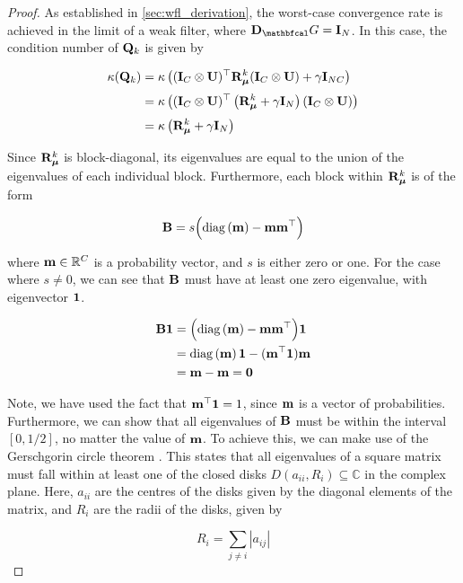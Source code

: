 \begin{proof}
    As established in \cref{sec:wfl_derivation}, the worst-case convergence rate is achieved in the limit of a weak filter, where $\D_\Gt = \I_N$. In this case, the condition number of $\mathbf{Q}_k$ is given by 

    \begin{align*}
        \kappa(\mathbf{Q}_k) &= \kappa\left( (\mathbf{I}_C \otimes \mathbf{U})^\top \mathbf{R}_{\boldsymbol{\mu}}^k (\mathbf{I}_C \otimes \mathbf{U}) + \gamma \mathbf{I}_{NC}\right) \\[0.1cm]
        &=  \kappa\left( (\mathbf{I}_C \otimes \mathbf{U})^\top \left(\mathbf{R}_{\boldsymbol{\mu}}^k + \gamma \mathbf{I}_N\right) (\mathbf{I}_C \otimes \mathbf{U})  \right) \\[0.1cm]
        &= \kappa\left( \mathbf{R}_{\boldsymbol{\mu}}^k + \gamma \mathbf{I}_N\right)
    \end{align*}

    Since $\mathbf{R}_{\boldsymbol{\mu}}^k$ is block-diagonal, its eigenvalues are equal to the union of the eigenvalues of each individual block. Furthermore, each block within  $\mathbf{R}_{\boldsymbol{\mu}}^k$ is of the form

    \begin{equation*}
        \mathbf{B} = s \Big(\text{\textup{diag}}\left(\mathbf{m}\right) - \mathbf{m} \mathbf{m}^\top\Big)
    \end{equation*}
    
    where $\mathbf{m} \in \mathbb{R}^C$ is a probability vector, and $s$ is either zero or one. For the case where $s \neq 0$, we can see that $\mathbf{B}$ must have at least one zero eigenvalue, with eigenvector $\mathbf{1}$.     

    \begin{align*}
        \mathbf{B} \mathbf{1} &= \Big(\text{\textup{diag}}\left(\mathbf{m}\right) - \mathbf{m} \mathbf{m}^\top\Big) \mathbf{1} \\
        &= \text{\textup{diag}}\left(\mathbf{m}\right) \mathbf{1} - (\mathbf{m}^\top \mathbf{1}) \mathbf{m} \\
        &= \mathbf{m} - \mathbf{m} = \mathbf{0}
    \end{align*}

    Note, we have used the fact that $\mathbf{m}^\top \mathbf{1} = 1$, since $\mathbf{m}$ is a vector of probabilities. Furthermore, we can show that all eigenvalues of $\mathbf{B}$ must be within the interval $[0, 1/2]$, no matter the value of $\mathbf{m}$.  To achieve this, we can make use of the Gerschgorin circle theorem \citep{Gerschgorin1931}. This states that all eigenvalues of a square matrix must fall within at least one of the closed disks $D(a_{ii}, R_i) \subseteq \mathbb{C}$ in the complex plane. Here, $a_{ii}$ are the centres of the disks given by the diagonal elements of the matrix, and $R_i$ are the radii of the disks, given by 

    \begin{equation*}
        R_i = \sum_{j \neq i} |a_{ij}|
    \end{equation*}
    

\end{proof}
